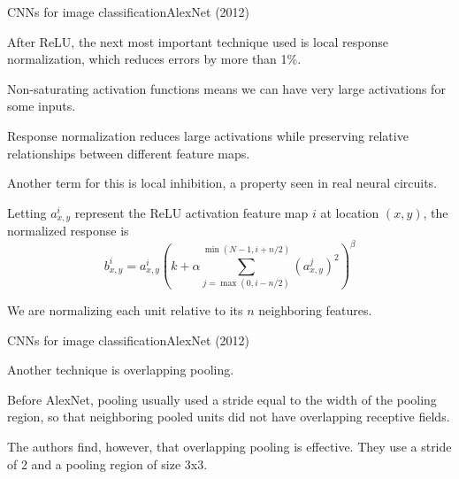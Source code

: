 \documentclass[aspectratio=169]{beamer}
\begin{document}
\begin{frame}{CNNs for image classification}{AlexNet (2012)}

  After ReLU, the next most important technique used is
  \alert{local response normalization}, which reduces errors by more than 1\%.

  \medskip

  Non-saturating activation functions means we can have very large
  activations for some inputs.

  \medskip
  
  Response normalization \alert{reduces large activations} while
  \alert{preserving relative relationships} between different feature
  maps.

  \medskip
  
  Another term for this is \alert{local inhibition}, a property seen
  in real neural circuits.

  \medskip
  
  Letting $a^{i}_{x,y}$ represent the ReLU activation feature map $i$
  at location $(x,y)$, the normalized response is
  $$ b^{i}_{x,y} = a^{i}_{x,y} \left( k + \alpha \sum_{j = \max(0,
    i-n/2)}^{\min( N-1,i+n/2)}\left(a^{j}_{x,y}\right)^2
  \right)^\beta $$

  \medskip

  We are normalizing each unit
  relative to its $n$ neighboring features.

\end{frame}


\begin{frame}{CNNs for image classification}{AlexNet (2012)}

  Another technique is \alert{overlapping pooling}.

  \medskip

  Before AlexNet, pooling usually used a stride equal to the width of
  the pooling region, so that neighboring pooled units did not have
  overlapping receptive fields.

  \medskip
  
  The authors find, however, that overlapping pooling is effective. They
  use a stride of 2 and a pooling region of size 3x3.

\end{frame}
\end{document}

